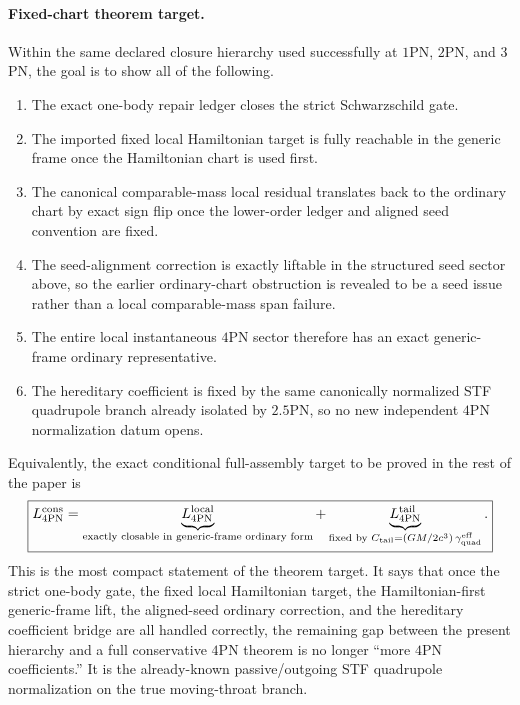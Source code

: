 \documentclass[11pt]{article}
\begin{document}
\paragraph{Fixed-chart theorem target.}
Within the same declared closure hierarchy used successfully at $1$PN, $2$PN,
and $3$PN, the goal is to show all of the following.
\begin{enumerate}
  \item The exact one-body repair ledger closes the strict Schwarzschild gate.

  \item The imported fixed local Hamiltonian target is fully reachable in the
  generic frame once the Hamiltonian chart is used first.

  \item The canonical comparable-mass local residual translates back to the
  ordinary chart by exact sign flip once the lower-order ledger and aligned seed
  convention are fixed.

  \item The seed-alignment correction is exactly liftable in the structured seed
  sector above, so the earlier ordinary-chart obstruction is revealed to be a
  seed issue rather than a local comparable-mass span failure.

  \item The entire local instantaneous $4$PN sector therefore has an exact
  generic-frame ordinary representative.

  \item The hereditary coefficient is fixed by the same canonically normalized
  STF quadrupole branch already isolated by $2.5$PN, so no new independent
  $4$PN normalization datum opens.
\end{enumerate}
Equivalently, the exact conditional full-assembly target to be proved in the
rest of the paper is
\[
\boxed{
L_{4\mathrm{PN}}^{\mathrm{cons}}
=
\underbrace{L_{4\mathrm{PN}}^{\mathrm{local}}}_{\text{exactly closable in generic-frame ordinary form}}
+
\underbrace{L_{4\mathrm{PN}}^{\mathrm{tail}}}_{\text{fixed by }C_{\rm tail}=(GM/2c^3)\,\gamma_{\rm quad}^{\rm eff}}.
}
\]
This is the most compact statement of the theorem target.  It says that once the
strict one-body gate, the fixed local Hamiltonian target, the Hamiltonian-first
generic-frame lift, the aligned-seed ordinary correction, and the hereditary
coefficient bridge are all handled correctly, the remaining gap between the
present hierarchy and a full conservative $4$PN theorem is no longer ``more
$4$PN coefficients.''  It is the already-known passive/outgoing STF quadrupole
normalization on the true moving-throat branch.
\end{document}
